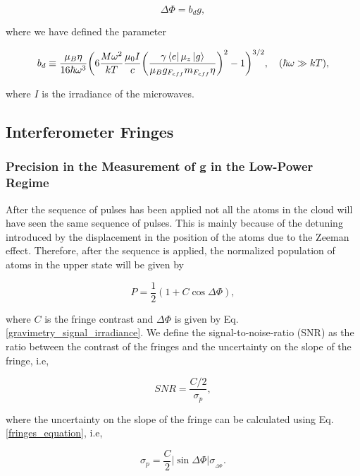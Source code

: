 \documentclass{article}
\begin{document}
\begin{equation}\label{gravimetry_signal_irradiance_dipole_trap}
    \Delta \Phi = b_{d} g, 
\end{equation}

where we have defined the parameter

\begin{equation}
    b_{d} \equiv \frac{\mu_{B} \eta}{16 \hbar \omega^{3}} \bigg(6 \frac{M \omega^{2}}{kT} \frac{\mu_{0} I}{c} \bigg(\frac{ \gamma  \bra{e} \mu_{z} \ket{g}}{\mu_{B} g_{F_{eff}} m_{F_{eff}} \eta}\bigg)^{2} - 1\bigg)^{3/2}, \quad (\hbar \omega \gg kT),
\end{equation}

where $I$ is the irradiance of the microwaves.

\subsection{Interferometer Fringes}
\subsubsection{Precision in the Measurement of g in the Low-Power Regime}
After the sequence of pulses has been applied not all the atoms in the cloud will have seen the same sequence of pulses. This is mainly because of the detuning introduced by the displacement in the position of the atoms due to the Zeeman effect. Therefore, after the sequence is applied, the normalized population of atoms in the upper state will be given by

\begin{equation}\label{fringes_equation}
    P = \frac{1}{2}(1+C\cos{\Delta \Phi}),
\end{equation}

where $C$ is the fringe contrast and $\Delta \Phi$ is given by Eq. \ref{gravimetry_signal_irradiance}. We define the signal-to-noise-ratio (SNR) as the ratio between the contrast of the fringes and the uncertainty on the slope of the fringe, i.e,

\begin{equation}
    SNR = \frac{C/2}{\sigma_{p}}, 
\end{equation}

where the uncertainty on the slope of the fringe can be calculated using Eq. \ref{fringes_equation}, i.e,

\begin{equation}
    \sigma_{p} = \frac{C}{2} |\sin{\Delta \Phi}| \sigma_{_{\Delta \Phi}}.
\end{equation}
\end{document}
